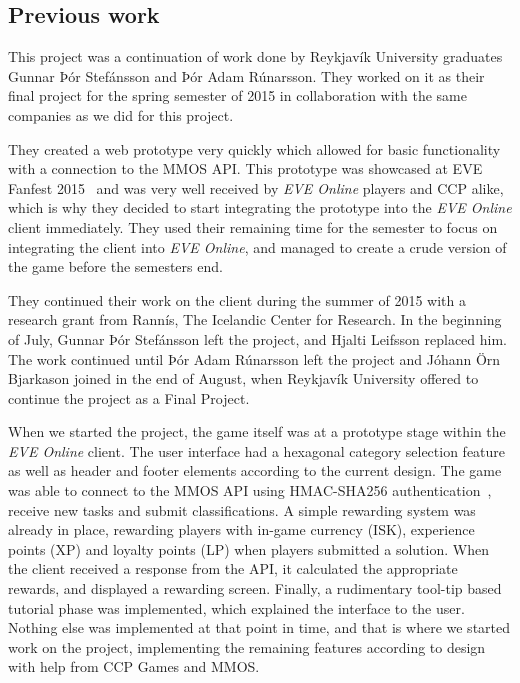 \subsection{Previous work}
This project was a continuation of work done by Reykjavík University graduates Gunnar Þór Stefánsson and Þór Adam Rúnarsson. They worked on it as their final project for the spring semester of 2015 in collaboration with the same companies as we did for this project.

They created a web prototype very quickly which allowed for basic functionality with a connection to the MMOS API. This prototype was showcased at EVE Fanfest 2015~\cite{fanfest} and was very well received by \emph{EVE Online} players and CCP alike, which is why they decided to start integrating the prototype into the \emph{EVE Online} client immediately. They used their remaining time for the semester to focus on integrating the client into \emph{EVE Online}, and managed to create a crude version of the game before the semesters end.

They continued their work on the client during the summer of 2015 with a research grant from Rannís, The Icelandic Center for Research. In the beginning of July, Gunnar Þór Stefánsson left the project, and Hjalti Leifsson replaced him. The work continued until Þór Adam Rúnarsson left the project and Jóhann Örn Bjarkason joined in the end of August, when Reykjavík University offered to continue the project as a Final Project.

When we started the project, the game itself was at a prototype stage within the \emph{EVE Online} client. The user interface had a hexagonal category selection feature as well as header and footer elements according to the current design. The game was able to connect to the MMOS API using HMAC-SHA256 authentication~\cite{hmac}, receive new tasks and submit classifications. A simple rewarding system was already in place, rewarding players with in-game currency (ISK), experience points (XP) and loyalty points (LP) when players submitted a solution. When the client received a response from the API, it calculated the appropriate rewards, and displayed a rewarding screen. Finally, a rudimentary tool-tip based tutorial phase was implemented, which explained the interface to the user. Nothing else was implemented at that point in time, and that is where we started work on the project, implementing the remaining features according to design with help from CCP Games and MMOS.